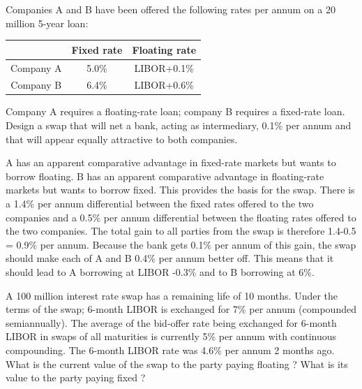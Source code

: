 \documentclass[12pt,a4paper]{exam}
\begin{document}
\begin{questions}

\question Companies A and B have been offered the following rates per annum on a 20 million 5-year loan:
\begin{center}
\begin{tabular}{|c|c|c|}
& Fixed rate & Floating rate \\ \hline
Company A &  5.0\% & LIBOR+0.1\% \\ \hline
Company B & 6.4\% & LIBOR+0.6\%  \\ \hline
\end{tabular}
\end{center}

Company A requires a floating-rate loan; company B requires a fixed-rate loan. Design a swap that will net a bank, acting as intermediary, 0.1\% per annum and that will appear equally attractive to both companies.
\begin{solution}
A has an apparent comparative advantage in fixed-rate markets but wants to borrow floating. B has an apparent comparative advantage in floating-rate markets but wants to borrow fixed. This provides the basis for the swap. There is a 1.4\% per annum differential between the fixed rates offered to the two companies and a 0.5\% per annum
differential between the floating rates offered to the two companies. The total gain to all parties from the swap is therefore 1.4-0.5 = 0.9\% per annum. Because the bank gets 0.1\% per annum of this gain, the swap should make each of A and B 0.4\% per
annum better off. This means that it should lead to A borrowing at LIBOR -0.3\% and to B borrowing at 6\%. 
\end{solution}

\question A 100 million interest rate swap has a remaining life of 10 months. Under the terms of the swap; 6-month LIBOR is exchanged for 7\% per annum (compounded semiannually). The average of the bid-offer rate being exchanged for 6-month LIBOR in swaps of all maturities is currently 5\% per annum with continuous compounding. The 6-month LIBOR rate was 4.6\% per annum 2 months ago. What is the current value of the swap to the party paying floating ? What is its value to the party paying fixed ?


\end{questions}
\end{document}

